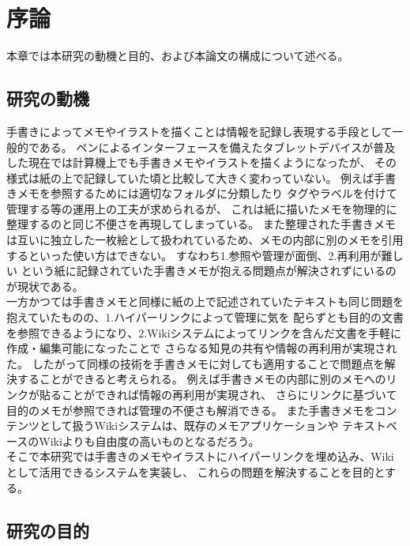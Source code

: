 \chapter{序論}
\label{chap:introduction}

本章では本研究の動機と目的、および本論文の構成について述べる。

\newpage

\section{研究の動機}
\label{douki}

手書きによってメモやイラストを描くことは情報を記録し表現する手段として一般的である。
ペンによるインターフェースを備えたタブレットデバイスが普及した現在では計算機上でも手書きメモやイラストを描くようになったが、
その様式は紙の上で記録していた頃と比較して大きく変わっていない。 例えば手書きメモを参照するためには適切なフォルダに分類したり
タグやラベルを付けて管理する等の運用上の工夫が求められるが、 これは紙に描いたメモを物理的に整理するのと同じ不便さを再現してしまっている。
また整理された手書きメモは互いに独立した一枚絵として扱われているため、メモの内部に別のメモを引用するといった使い方はできない。
すなわち1.参照や管理が面倒、2.再利用が難しい という紙に記録されていた手書きメモが抱える問題点が解決されずにいるのが現状である。
\\
一方かつては手書きメモと同様に紙の上で記述されていたテキストも同じ問題を抱えていたものの、1.ハイパーリンクによって管理に気を
配らずとも目的の文書を参照できるようになり、2.Wikiシステムによってリンクを含んだ文書を手軽に作成・編集可能になったことで
さらなる知見の共有や情報の再利用が実現された。
したがって同様の技術を手書きメモに対しても適用することで問題点を解決することができると考えられる。
例えば手書きメモの内部に別のメモへのリンクが貼ることができれば情報の再利用が実現され、
さらにリンクに基づいて目的のメモが参照できれば管理の不便さも解消できる。
また手書きメモをコンテンツとして扱うWikiシステムは、既存のメモアプリケーションや
テキストベースのWikiよりも自由度の高いものとなるだろう。
\\
そこで本研究では手書きのメモやイラストにハイパーリンクを埋め込み、Wikiとして活用できるシステムを実装し、
これらの問題を解決することを目的とする。


\section{研究の目的}

